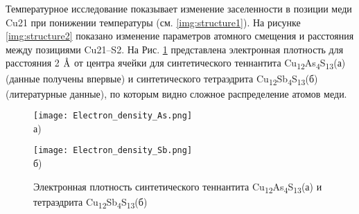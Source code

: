Температурное исследование показывает изменение  заселенности в позиции меди Cu21 при понижении температуры (см. \ref{img:structure1}). На рисунке \ref{img:structure2} показано изменение  параметров атомного смещения и расстояния между позициями Cu21--S2.
На Рис. \ref{img:electro} представлена электронная плотность для расстояния 2 $\mbox{\normalfont\AA}$ от центра ячейки для синтетического теннантита Cu\textsubscript{12}As\textsubscript{4}S\textsubscript{13}(а) (данные получены впервые) и синтетического тетраэдрита Cu\textsubscript{12}Sb\textsubscript{4}S\textsubscript{13}(б) (литературные данные), по которым видно сложное распределение атомов меди.


\begin{figure}[hb]
  \begin{minipage}[ht]{0.5\linewidth}\centering
    \texttt{[image: Electron\_density\_As.png]} \\ а)
  \end{minipage}
  \hfill
  \begin{minipage}[ht]{0.5\linewidth}\centering
    \texttt{[image: Electron\_density\_Sb.png]} \\ б)
  \end{minipage}

 \caption[Электронная плотность синтетического теннантита Cu\textsubscript{12}As\textsubscript{4}S\textsubscript{13}(а) и тетраэдрита Cu\textsubscript{12}Sb\textsubscript{4}S\textsubscript{13}(б)]{Электронная плотность синтетического теннантита Cu\textsubscript{12}As\textsubscript{4}S\textsubscript{13}(а) и тетраэдрита Cu\textsubscript{12}Sb\textsubscript{4}S\textsubscript{13}(б)}
   \label{img:electro}
\end{figure}

